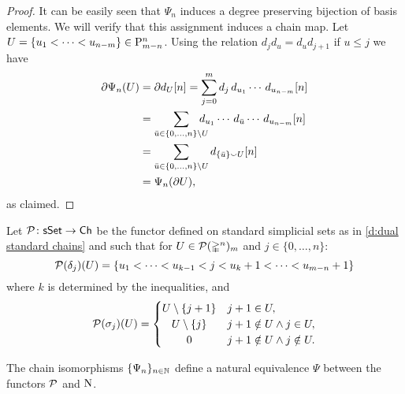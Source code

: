 \begin{proof}
	It can be easily seen that $\Psi_n$ induces a degree preserving bijection of basis elements.
	We will verify that this assignment induces a chain map.
	Let $U = \{u_1 < \cdots < u_{n-m}\} \in \mathrm{P}_{m-n}^n$.
	Using the relation $d_jd_u = d_ud_{j+1}$ if $u \leq j$ we have
	\begin{align*}
	\partial \Psi_n(U) &=
	\partial d_U[n] =
	\sum_{j=0}^{m} d_j\, d_{u_1} \cdots\, d_{u_{n-m}}[n] \\ &=
	\sum_{\bar u \in \{0, \dots, n\} \setminus U}
	\hspace*{-10pt} d_{u_1} \cdots\, d_{\bar{u}} \cdots\, d_{u_{n-m}}[n] \\ &=
	\sum_{\bar u \in \{0, \dots, n\} \setminus U} d_{\{\bar u\} \union U}[n] \\ &=
	\Psi_n(\partial U),
	\end{align*}
	as claimed.
\end{proof}


\begin{definition}
	Let $\mathcal{P} \colon \mathsf{sSet} \to \mathsf{Ch}$ be the functor defined on standard simplicial sets as in \cref{d:dual standard chains} and such that for $U \in \mathcal{P}(\mathbb{\Delta}^n)_m$ and $j \in \{0, \dots, n\}$:
	\[
	\mathcal{P}(\delta_j)(U) = \{ u_1 < \dots < u_{k-1} < j < u_k+1 < \dots < u_{m-n}+1 \}
	\]
	where $k$ is determined by the inequalities, and
	\begin{equation} \label{e:action of P on a codegeneracy}
	\cP(\sigma_j)(U) = \begin{cases}
	U \setminus \{j+1\} & j+1 \in U, \\
	\hfil U \setminus \{j\} & j+1 \notin U \wedge j \in U, \\
	\hfil 0 & j+1 \notin U \wedge j \notin U.
	\end{cases}
	\end{equation}
\end{definition}

\begin{lemma}
	The chain isomorphisms $\{\Psi_n\}_{n \in \mathbb{N}}$ define a natural equivalence $\Psi$ between the functors $\mathcal{P}$ and $\operatorname{N}$.
\end{lemma}

